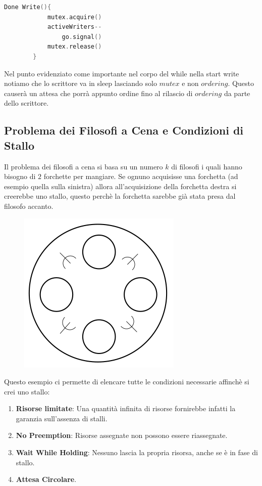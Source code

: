 \documentclass{article}
\begin{document}
\begin{enumerate}
\begin{lstlisting}[language = C]
        Done Write(){
            mutex.acquire()
            activeWriters--
                go.signal()
            mutex.release()
        }

    \end{lstlisting}
    
Nel punto evidenziato come importante nel corpo del while nella start write notiamo che lo scrittore va in sleep lasciando solo $mutex$ e non $ordering$.
Questo causerà un attesa che porrà appunto ordine fino al rilascio di $ordering$ da parte dello scrittore.

\end{enumerate}

\newpage

\subsection{Problema dei Filosofi a Cena e Condizioni di Stallo}

Il problema dei filosofi a cena si basa su un numero $k$ di filosofi i quali hanno bisogno di $2$ forchette per mangiare. Se ognuno acquisisse una forchetta (ad esempio quella sulla sinistra) allora all'acquisizione della forchetta destra
si creerebbe uno stallo, questo perchè la forchetta sarebbe già stata presa dal filosofo accanto. 

\begin{figure}[htbp]
    \center
    \includegraphics[scale=0.4]{img/preludiodidelus.png}
\end{figure}

Questo esempio ci permette di elencare tutte le condizioni necessarie affinchè si crei uno stallo:

\begin{enumerate}
    \item \textbf{Risorse limitate}: Una quantità infinita di risorse fornirebbe infatti la garanzia sull'assenza di stalli.
    \item \textbf{No Preemption}: Risorse assegnate non possono essere riassegnate.
    \item \textbf{Wait While Holding}: Nessuno lascia la propria risorsa, anche se è in fase di stallo.
    \item \textbf{Attesa Circolare}.
\end{enumerate}
\end{document}
